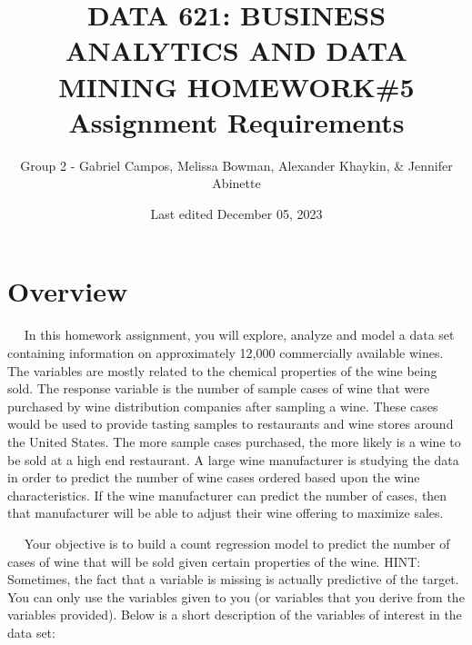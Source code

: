 \documentclass[
]{article}
\title{DATA 621: BUSINESS ANALYTICS AND DATA MINING HOMEWORK\#5
Assignment Requirements}
\author{Group 2 - Gabriel Campos, Melissa Bowman, Alexander Khaykin, \&
Jennifer Abinette}
\date{Last edited December 05, 2023}
\begin{document}
\maketitle

{
\hypersetup{linkcolor=}
\setcounter{tocdepth}{4}
\tableofcontents
}
\hypertarget{overview}{%
\section{Overview}\label{overview}}

  In this homework assignment, you will explore, analyze and model a
data set containing information on approximately 12,000 commercially
available wines. The variables are mostly related to the chemical
properties of the wine being sold. The response variable is the number
of sample cases of wine that were purchased by wine distribution
companies after sampling a wine. These cases would be used to provide
tasting samples to restaurants and wine stores around the United States.
The more sample cases purchased, the more likely is a wine to be sold at
a high end restaurant. A large wine manufacturer is studying the data in
order to predict the number of wine cases ordered based upon the wine
characteristics. If the wine manufacturer can predict the number of
cases, then that manufacturer will be able to adjust their wine offering
to maximize sales.

  Your objective is to build a count regression model to predict the
number of cases of wine that will be sold given certain properties of
the wine. HINT: Sometimes, the fact that a variable is missing is
actually predictive of the target. You can only use the variables given
to you (or variables that you derive from the variables provided). Below
is a short description of the variables of interest in the data set:
\end{document}
